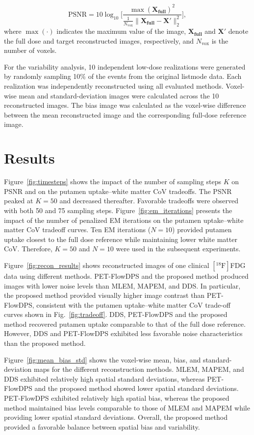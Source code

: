 \documentclass[journal]{IEEEtran}
\begin{document}
\begin{equation}
\label{eq:psnr}
\text{PSNR} = 10\log_{10}\Biggl[\frac{\max{(\bm{X_\text{full}})}^2}{\frac{1}{N_\text{vox}}\bigl\lVert\bm{X_\text{full}}-\bm{X}'\bigr\rVert_{2}^{2}}\Biggr],
\end{equation}
where $\max{(\cdot)}$ indicates the maximum value of the image, $\bm{X_\text{full}}$ and $\bm{X}'$ denote the full dose and target reconstructed images, respectively, and $N_\text{vox}$ is the number of voxels.

For the variability analysis, 10 independent low-dose realizations were generated by randomly sampling 10\% of the events from the original listmode data. Each realization was independently reconstructed using all evaluated methods. Voxel-wise mean and standard-deviation images were calculated across the 10 reconstructed images. The bias image was calculated as the voxel-wise difference between the mean reconstructed image and the corresponding full-dose reference image.

\section{Results}
Figure~\ref{fig:timesteps} shows the impact of the number of sampling steps $K$ on PSNR and on the putamen uptake--white matter CoV tradeoffs. The PSNR peaked at $K=50$ and decreased thereafter. Favorable tradeoffs were observed with both 50 and 75 sampling steps. Figure~\ref{fig:em_iterations} presents the impact of the number of penalized EM iterations on the putamen uptake--white matter CoV tradeoff curves. Ten EM iterations ($N=10$) provided putamen uptake closest to the full dose reference while maintaining lower white matter CoV. Therefore, $K=50$ and $N=10$ were used in the subsequent experiments.

Figure~\ref{fig:recon_results} shows reconstructed images of one clinical $[^{18}\mathrm{F}]$FDG data using different methods. PET-FlowDPS and the proposed method produced images with lower noise levels than MLEM, MAPEM, and DDS. In particular, the proposed method provided visually higher image contrast than PET-FlowDPS, consistent with the putamen uptake--white matter CoV trade-off curves shown in Fig.~\ref{fig:tradeoff}. DDS, PET-FlowDPS and the proposed method recovered putamen uptake comparable to that of the full dose reference. However, DDS and PET-FlowDPS exhibited less favorable noise characteristics than the proposed method.

Figure~\ref{fig:mean_bias_std} shows the voxel-wise mean, bias, and standard-deviation maps for the different reconstruction methods.
MLEM, MAPEM, and DDS exhibited relatively high spatial standard deviations, whereas PET-FlowDPS and the proposed method showed lower spatial standard deviations. PET-FlowDPS exhibited relatively high spatial bias, whereas the proposed method maintained bias levels comparable to those of MLEM and MAPEM while providing lower spatial standard deviations. Overall, the proposed method provided a favorable balance between spatial bias and variability. 
\end{document}
